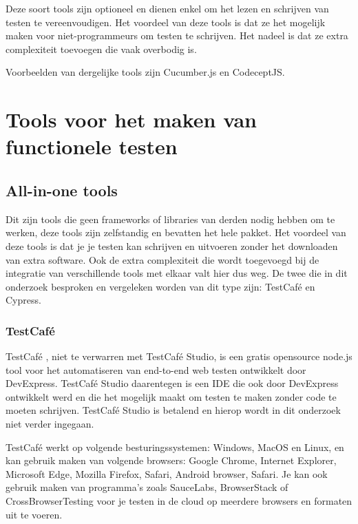 Deze soort tools zijn optioneel en dienen enkel om het lezen en schrijven van testen te vereenvoudigen. Het voordeel van deze tools is dat ze het mogelijk maken voor niet-programmeurs om testen te schrijven. Het nadeel is dat ze extra complexiteit toevoegen die vaak overbodig is.

Voorbeelden van dergelijke tools zijn Cucumber.js en CodeceptJS.

\section{Tools voor het maken van functionele testen}
\subsection{All-in-one tools}

Dit zijn tools die geen frameworks of libraries van derden nodig hebben om te werken, deze tools zijn zelfstandig en bevatten het hele pakket. Het voordeel van deze tools is dat je je testen kan schrijven en uitvoeren zonder het downloaden van extra software. Ook de extra complexiteit die wordt toegevoegd bij de integratie van verschillende tools met elkaar valt hier dus weg. De twee die in dit onderzoek besproken en vergeleken worden van dit type zijn: TestCafé en Cypress.

\subsubsection{TestCafé}
TestCafé \autocite{Testcafe}, niet te verwarren met TestCafé Studio, is een  gratis opensource node.js tool voor het automatiseren van end-to-end web testen ontwikkelt door DevExpress. TestCafé Studio daarentegen is een IDE die ook door DevExpress ontwikkelt werd en die het mogelijk maakt om testen te maken zonder code te moeten schrijven. TestCafé Studio is betalend en hierop wordt in dit onderzoek niet verder ingegaan. 

TestCafé werkt op volgende besturingssystemen: Windows, MacOS en Linux, en kan gebruik maken van volgende browsers: Google Chrome, Internet Explorer, Microsoft Edge, Mozilla Firefox, Safari, Android browser, Safari. Je kan ook gebruik maken van programma's zoals SauceLabs, BrowserStack of CrossBrowserTesting voor je testen in de cloud op meerdere browsers en formaten uit te voeren.

